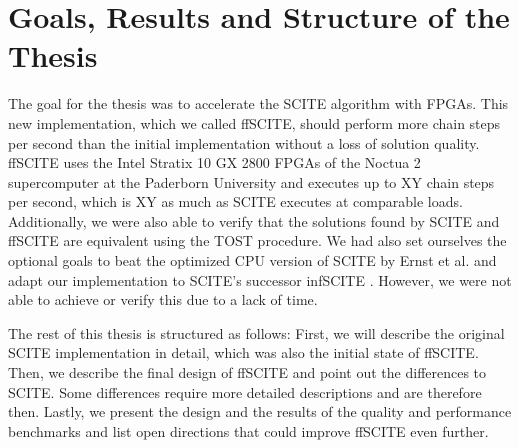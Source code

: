 \section{Goals, Results and Structure of the Thesis}


The goal for the thesis was to accelerate the SCITE algorithm with FPGAs. This new implementation, which we called \ac{ffSCITE}, should perform more chain steps per second than the initial implementation without a loss of solution quality. ffSCITE uses the Intel Stratix 10 GX 2800 FPGAs of the Noctua 2 supercomputer at the Paderborn University and executes up to XY chain steps per second, which is XY as much as SCITE executes at comparable loads. Additionally, we were also able to verify that the solutions found by \ac{SCITE} and \ac{ffSCITE} are equivalent using the \ac{TOST} \cite{schuirmann1987comparison} procedure. We had also set ourselves the optional goals to beat the optimized CPU version of \ac{SCITE} by Ernst et al. \cite{ernst2020Performance} and adapt our implementation to \ac{SCITE}'s successor \ac{infSCITE} \cite{kuipers2017single}. However, we were not able to achieve or verify this due to a lack of time.

The rest of this thesis is structured as follows: First, we will describe the original \ac{SCITE} implementation in detail, which was also the initial state of \ac{ffSCITE}. Then, we describe the final design of \ac{ffSCITE} and point out the differences to \ac{SCITE}. Some differences require more detailed descriptions and are therefore then. Lastly, we present the design and the results of the quality and performance benchmarks and list open directions that could improve \ac{ffSCITE} even further.